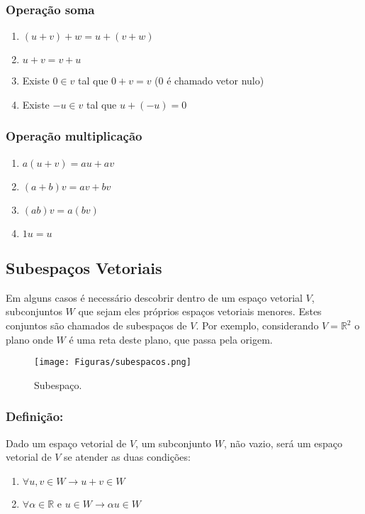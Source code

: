 \subsubsection{Operação soma}
\begin{enumerate}
    \item $(u + v) + w = u + ( v + w)$
    \item $u + v = v + u$
    \item Existe $0 \in v$ tal que $0 + v = v$ (0 é chamado vetor nulo)
    \item Existe $- u \in v$ tal que $u + (-u) = 0$
\end{enumerate}
\subsubsection{Operação multiplicação}
\begin{enumerate}
    \item $a(u + v) = au + av$
    \item $(a + b)v = av + bv$
    \item $(ab)v = a(bv)$
    \item $1u = u$
\end{enumerate}

\subsection{Subespaços Vetoriais}
\noindent Em alguns casos é necessário descobrir dentro de um espaço vetorial $V$, subconjuntos $W$ que sejam eles próprios espaços vetoriais menores. Estes conjuntos são chamados de subespaços de $V$. Por exemplo, considerando $V = \mathbb{R}^{2}$ o plano onde $W$ é uma reta deste plano, que passa pela origem.

\begin{figure}[!hb]
  \centering \texttt{[image: Figuras/subespacos.png]}
  \caption{Subespaço.}
  \label{chave_para_refencia_cruzada}
\end{figure}

\subsubsection{Definição:}
\noindent Dado um espaço vetorial de $V$, um subconjunto $W$, não vazio, será um espaço vetorial de $V$ se atender as duas condições:

\begin{enumerate}
    \item $\forall u, v \in W \rightarrow u + v \in W$
    \item $\forall \alpha \in \mathbb{R}$ e $u \in W \rightarrow \alpha u \in W$
\end{enumerate}

